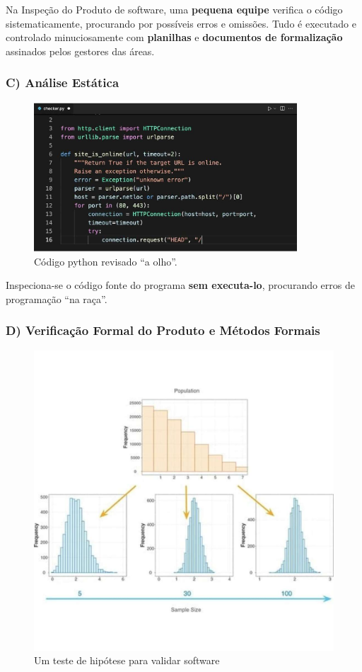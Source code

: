 \documentclass[
]{book}
\begin{document}
Na Inspeção do Produto de software, uma \textbf{pequena equipe} verifica o código sistematicamente, procurando por possíveis erros e omissões. Tudo é executado e controlado minuciosamente com \textbf{planilhas} e \textbf{documentos de formalização} assinados pelos gestores das áreas.

\subsubsection{C) Análise Estática}\label{c-anuxe1lise-estuxe1tica}

\begin{figure}
\centering
\includegraphics[width=3.875in,height=\textheight]{images/analise-estatica-python.jpg}
\caption{Código python revisado ``a olho''.}
\end{figure}

Inspeciona-se o código fonte do programa \textbf{sem executa-lo}, procurando erros de programação ``na raça''.

\subsubsection{D) Verificação Formal do Produto e Métodos Formais}\label{d-verificauxe7uxe3o-formal-do-produto-e-muxe9todos-formais}

\begin{figure}
\centering
\includegraphics{images/estatistica.jpg}
\caption{Um teste de hipótese para validar software}
\end{figure}
\end{document}
